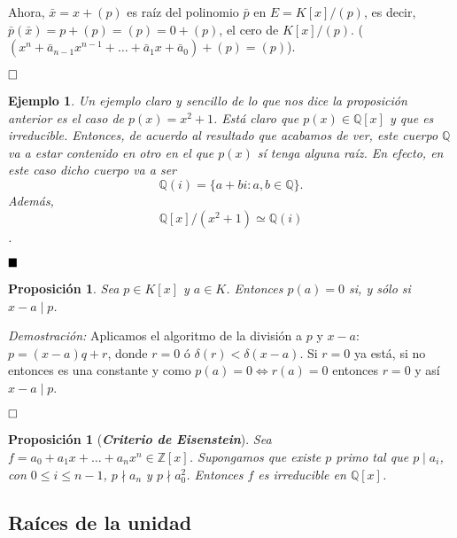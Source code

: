 \documentclass[12pt]{article}
\newtheorem{proposition}[theorem]{Proposición}
\newtheorem{example}{Ejemplo}[theorem]
\begin{document}
Ahora, $\bar{x} = x +(p)$ es raíz del polinomio $\bar{p}$ en $E= K[x]/(p)$, es decir, $\bar{p}(\bar{x}) = p+(p) = (p) = 0 +(p)$, el cero de $K[x]/(p)$. ($(x^{n}+ \bar{a}_{n-1}x^{n-1}+ \ldots + \bar{a}_{1}x + \bar{a}_{0}) + (p) = (p)$).

$\hfill \square$

\begin{example} Un ejemplo claro y sencillo de lo que nos dice la proposición anterior es el caso de $p(x) = x^{2}+1$. Está claro que $p(x) \in \mathbb{Q}[x]$ y que es irreducible. Entonces, de acuerdo al resultado que acabamos de ver, este cuerpo $\mathbb{Q}$ va a estar contenido en otro en el que $p(x)$ sí tenga alguna raíz. En efecto, en este caso dicho cuerpo va a ser $$\mathbb{Q}(i) = \lbrace a + bi :a,b \in \mathbb{Q} \rbrace.$$ Además, $$\mathbb{Q}[x]/(x^{2}+1) \simeq \mathbb{Q}(i)$$.
\end{example}

$\hfill \blacksquare$

\begin{proposition}\label{eq:ac2} Sea $p \in K[x]$ y $a \in K$. Entonces $p(a) = 0$ si, y sólo si $x-a \mid p$.
\end{proposition}
\emph{Demostración: } Aplicamos el algoritmo de la división a $p$ y $x-a$: $p=(x-a)q + r$, donde $r = 0$ ó $\delta(r) < \delta(x-a)$. Si $r= 0$ ya está, si no entonces es una constante y como $p(a) = 0 \Leftrightarrow r(a)= 0$ entonces $r = 0$ y así $x-a \mid p$.

$\hfill \square$

\begin{proposition}[\textbf{\textit{Criterio de Eisenstein}}] Sea $f= a_{0} + a_{1}x + \ldots + a_{n}x^{n} \in \mathbb{Z}[x]$. Supongamos que existe $p$ primo tal que $p \mid a_{i}$, con $0 \leq i \leq n-1$, $p \nmid a_{n}$ y $p \nmid a_{0}^{2}$. Entonces $f$ es irreducible en $\mathbb{Q}[x]$.
\end{proposition} 

\subsection{Raíces de la unidad}
\end{document}
